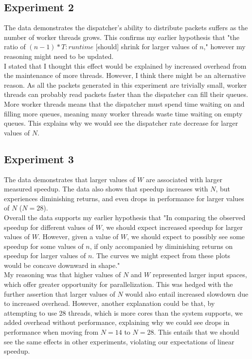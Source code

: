 \documentclass[]{article}
\begin{document}
\subsection{Experiment 2}
The data demonstrates the dispatcher's ability to distribute packets suffers as the number of worker threads grows. This confirms my earlier hypothesis that "the ratio of $(n - 1) * T : runtime$ [should] shrink for larger values of $n$," however my reasoning might need to be updated.
\\
I stated that I thought this effect would be explained by increased overhead from the maintenance of more threads. However, I think there might be an alternative reason. As all the packets generated in this experiment are trivially small, worker threads can probably read packets faster than the dispatcher can fill their queues. More worker threads means that the dispatcher must spend time waiting on and filling more queues, meaning many worker threads waste time waiting on empty queues. This explains why we would see the dispatcher rate decrease for larger values of $N$.
\subsection{Experiment 3}
The data demonstrates that larger values of $W$ are associated with larger measured speedup. The data also shows that speedup increases with $N$, but experiences diminishing returns, and even drops in performance for larger values of $N$ ($N = 28$).
\\
Overall the data supports my earlier hypothesis that "In comparing the observed speedup for different values of $W$, we should expect increased speedup for larger values of $W$. However, given a value of $W$, we should expect to possibly see some speedup for some values of $n$, if only accompanied by diminishing returns on speedup for larger values of $n$. The curves we might expect from these plots  would be concave downward in shape."
\\
My reasoning was that higher values of $N$ and $W$ represented larger input spaces, which offer greater opportunity for parallelization. This was hedged with the further assertion that larger values of $N$ would also entail increased slowdown due to increased overhead. However, another explanation could be that, by attempting to use 28 threads, which is more cores than the system supports, we added overhead without performance, explaining why we could see drops in performance when moving from $N = 14$ to $N = 28$. This entails that we should see the same effects in other experiments, violating our expectations of linear speedup.
\end{document}
